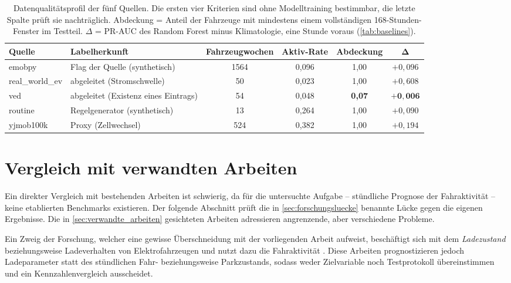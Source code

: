 \begin{table}[H]
    \centering
    \caption{Datenqualitätsprofil der fünf Quellen. Die ersten vier Kriterien sind
    ohne Modelltraining bestimmbar, die letzte Spalte prüft sie nachträglich.
    Abdeckung = Anteil der Fahrzeuge mit mindestens einem vollständigen
    168-Stunden-Fenster im Testteil. $\Delta$ = PR-AUC des Random Forest minus
    Klimatologie, eine Stunde voraus (\cref{tab:baselines}).}
    \label{tab:datenqualitaet}
    \begin{tabularx}{\textwidth}{@{}lXccc c@{}}
        \toprule
        \textbf{Quelle} & \textbf{Labelherkunft} & \textbf{Fahrzeug\-wochen} &
        \textbf{Aktiv-Rate} & \textbf{Abdeckung} & $\boldsymbol{\Delta}$ \\
        \midrule
        emobpy          & Flag der Quelle (synthetisch)      & 1564 & 0,096 & 1,00 & $+0,096$ \\
        \addlinespace
        real\_world\_ev & abgeleitet (Stromschwelle)         & 50   & 0,023 & 1,00 & $+0,608$ \\
        \addlinespace
        ved             & abgeleitet (Existenz eines Eintrags) & 54 & 0,048 & \textbf{0,07} & $\mathbf{+0,006}$ \\
        \addlinespace
        routine         & Regelgenerator (synthetisch)       & 13   & 0,264 & 1,00 & $+0,090$ \\
        \addlinespace
        yjmob100k       & Proxy (Zellwechsel)                & 524  & 0,382 & 1,00 & $+0,194$ \\
        \bottomrule
    \end{tabularx}
\end{table}

\section{Vergleich mit verwandten Arbeiten}
\label{sec:vergleich}

Ein direkter Vergleich mit bestehenden Arbeiten ist schwierig, da für die untersuchte Aufgabe -- stündliche Prognose der Fahraktivität -- keine etablierten Benchmarks existieren. Der folgende Abschnitt prüft die in \cref{sec:forschungsluecke} benannte Lücke gegen die eigenen Ergebnisse. Die in \cref{sec:verwandte_arbeiten} gesichteten Arbeiten adressieren angrenzende, aber verschiedene Probleme. 


Ein Zweig der Forschung, welcher eine gewisse Überschneidung mit der vorliegenden Arbeit aufweist, beschäftigt sich mit dem \textit{Ladezustand} beziehungsweise Ladeverhalten von Elektrofahrzeugen und nutzt dazu die Fahraktivität \parencite{khwaja2021performance,kreft2024predictability,alikhani2025comprehensive,frendo2021improving,frendo2020datadriven}. Diese Arbeiten prognostizieren jedoch Ladeparameter statt des stündlichen Fahr- beziehungsweise Parkzustands, sodass weder Zielvariable noch Testprotokoll übereinstimmen und ein Kennzahlenvergleich ausscheidet.

